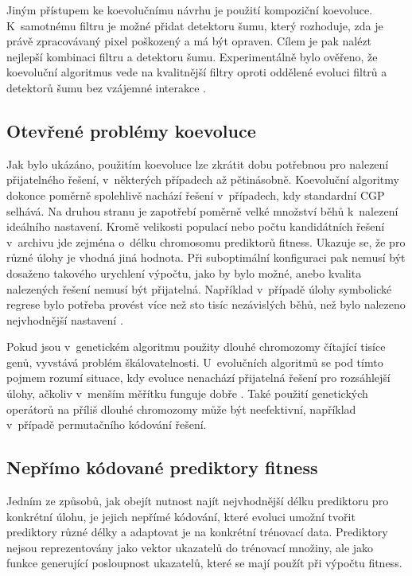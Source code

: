 Jiným přístupem ke koevolučnímu návrhu je použití kompoziční koevoluce. K~samotnému filtru je možné přidat detektoru šumu, který rozhoduje, zda je právě zpracovávaný pixel poškozený a má být opraven. Cílem je pak nalézt nejlepší kombinaci filtru a detektoru šumu. Experimentálně bylo ověřeno, že koevoluční algoritmus vede na kvalitnější filtry oproti oddělené evoluci filtrů a detektorů šumu bez vzájemné interakce \cite{SikuKomjathy}.

\subsection{Otevřené problémy koevoluce}
\label{secProblems}

Jak bylo ukázáno, použitím koevoluce lze zkrátit dobu potřebnou pro nalezení přijatelného řešení, v~některých případech až pětinásobně. Koevoluční algoritmy dokonce poměrně spolehlivě nachází řešení v~případech, kdy standardní CGP selhává. Na druhou stranu je zapotřebí poměrně velké množství běhů k~nalezení ideálního nastavení. Kromě velikosti populací nebo počtu kandidátních řešení v~archivu jde zejména o~délku chromosomu prediktorů fitness. Ukazuje se, že pro různé úlohy je vhodná jiná hodnota. Při suboptimální konfiguraci pak nemusí být dosaženo takového urychlení výpočtu, jako by bylo možné, anebo kvalita nalezených řešení nemusí být přijatelná. Například v~případě úlohy symbolické regrese bylo potřeba provést více než sto tisíc nezávislých běhů, než bylo nalezeno nejvhodnější nastavení \cite{SikuEuroGP}.

Pokud jsou v~genetickém algoritmu použity dlouhé chromozomy čítající tisíce genů, vyvstává problém škálovatelnosti. U~evolučních algoritmů se pod tímto pojmem rozumí situace, kdy evoluce nenachází přijatelná řešení pro rozsáhlejší úlohy, ačkoliv v~menším měřítku funguje dobře \cite{SikuKomjathy}. Také použití genetických operátorů na příliš dlouhé chromozomy může být neefektivní, například v~případě permutačního kódování řešení.


\subsection{Nepřímo kódované prediktory fitness}
\label{secIndirectPredictors}

Jedním ze způsobů, jak obejít nutnost najít nejvhodnější délku prediktoru pro konkrétní úlohu, je jejich nepřímé kódování, které evoluci umožní tvořit prediktory různé délky a adaptovat je na konkrétní trénovací data. Prediktory nejsou reprezentovány jako vektor ukazatelů do trénovací množiny, ale jako funkce generující posloupnost ukazatelů, které se mají použít při výpočtu fitness.

